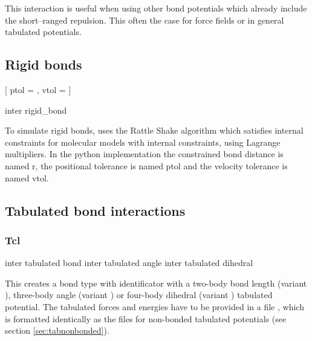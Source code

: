 This interaction is useful when using other bond potentials which already
include the short--ranged repulsion. This often the case for force fields or in
general tabulated potentials.

\subsection{Rigid bonds}
\label{sec:rattle}

\begin{pysyntax}
  [
    ptol = ,
    vtol = 
  ]
\end{pysyntax}

\begin{essyntax}
  inter 
  rigid_bond
    
  \begin{features}
  \end{features}
\end{essyntax}

To simulate rigid bonds, \es uses the Rattle Shake algorithm which
satisfies internal constraints for molecular models with internal
constraints, using Lagrange multipliers.\cite{andersen83a}
In the python implementation the constrained bond distance is named r, the positional tolerance is named ptol and the velocity tolerance is named vtol.

\subsection{Tabulated bond interactions}

\subsubsection{Tcl}
\begin{essyntax}
     inter 
    tabulated bond 
     inter 
    tabulated angle 
     inter 
    tabulated dihedral 
\end{essyntax}
This creates a bond type with identificator  with a
two-body bond length (variant ), three-body angle (variant
) or four-body dihedral (variant ) tabulated
potential. The tabulated forces and energies have to be provided in a
file , which is formatted identically as the files for
non-bonded tabulated potentials (see section \ref{sec:tabnonbonded}).


